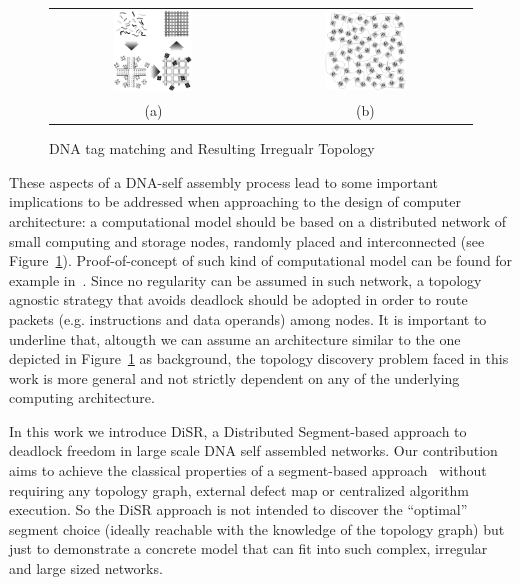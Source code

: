 \begin{figure}
\centering
\begin{tabular}{cc}
    \includegraphics[width=0.40\textwidth]{pictures/dna2b.eps} &
    \includegraphics[width=0.40\textwidth]{pictures/dna1_complex2.eps} \\
 (a) & (b)
 \end{tabular}
  \caption{DNA tag matching and Resulting Irregualr Topology}
  \label{fig:nana}
\end{figure}
These aspects of a DNA-self assembly process lead to some important
implications to be addressed when approaching to the design of
computer architecture: a computational model should be based on a
distributed network of small computing and storage nodes, randomly
placed and interconnected (see Figure~\ref{fig:nana}).
Proof-of-concept of such kind of computational model can be found for
example in~\cite{patwardhan2006_1}.  Since no regularity can be
assumed in such network, a topology agnostic strategy that avoids
deadlock should be adopted in order to route packets (e.g.
instructions and data operands) among nodes.  It is important to
underline that, altougth we can assume an architecture similar to the
one depicted in Figure~\ref{fig:nana} as background, the topology discovery
problem faced in this work is more general and not strictly dependent on any of the
underlying computing architecture.

In this work we introduce DiSR, a Distributed Segment-based approach
to deadlock freedom in large scale DNA self assembled networks. Our
contribution aims to achieve the classical properties of a
segment-based approach~\cite{mejia_ipdps06} without requiring any
topology graph, external defect map or centralized algorithm
execution.  So the DiSR approach is not intended to discover the
``optimal'' segment choice (ideally reachable with the knowledge of
the topology graph) but just to demonstrate a concrete model that can
fit into such complex, irregular and large sized networks.

